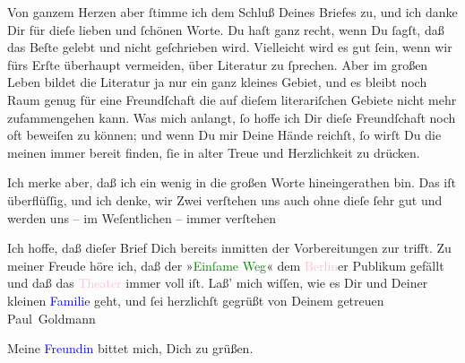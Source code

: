 \pstart
           Von ganzem Herzen  aber ſtimme ich dem Schluß Deines Briefes zu, und ich danke Dir für dieſe
               lieben {\pb}und ſchönen Worte. Du haſt ganz recht, wenn
               Du ſagſt, daß das Beſte gelebt und nicht geſchrieben wird. Vielleicht wird es gut
               ſein, wenn wir fürs Erſte überhaupt vermeiden, über Literatur zu ſprechen. Aber im
               großen Leben bildet die Literatur ja nur ein ganz kleines Gebiet, und es bleibt noch
               Raum genug für eine Freundſchaft die auf dieſem literariſchen Gebiete nicht mehr
               zufammengehen kann. Was mich anlangt, ſo hoffe ich Dir dieſe Freundſchaft noch oft
               beweiſen zu können; und  wenn Du mir Deine Hände
               reichſt, ſo wirſt Du die meinen immer bereit finden, ſie \strikeout{\textcolor{gray}{×}\-\textcolor{gray}{×}\-\textcolor{gray}{×}} in alter Treue und Herzlichkeit zu drücken.\pend
           
\pstart
            Ich merke aber, daß ich ein wenig in die großen Worte hineingerathen bin. Das
               iſt überflüſſig, und ich denke, wir Zwei verſtehen uns {\pb}auch ohne dieſe ſehr gut und werden uns – im Weſentlichen – immer verſtehen{\dotsfour}\pend
           
\pstart
           Ich hoffe, daß dieſer Brief Dich bereits inmitten der Vorbereitungen zur \label{K_L03440-4v}\label{K_L03440-4h} trifft. Zu meiner Freude höre
               ich, daß der »\textcolor{green}{Einſame Weg}{}\ledrightnote{\textcolor{green}{Der einsame Weg. Schauspiel in fünf Akten}}« dem \textcolor{pink}{Berlin}{}\ledrightnote{\textcolor{pink}{Berlin}}er Publikum gefällt und daß das \textcolor{pink}{Theater}{}\ledrightnote{{$\rightarrow$}\textcolor{pink}{Deutsches Theater Berlin}} immer voll iſt. Laß’ mich wiſſen, wie
               es Dir und Deiner kleinen \textcolor{blue}{Familie}{}\ledrightnote{{$\rightarrow$}\textcolor{blue}{Olga Schnitzler}{\newline}{$\rightarrow$}\textcolor{blue}{Heinrich Schnitzler}} geht, und ſei herzlichſt gegrüßt von Deinem
               getreuen \spacefill\mbox{Paul Goldmann}\pend
           
\pstart
           \noindent{}Meine \textcolor{blue}{Freundin}{}\ledrightnote{{$\rightarrow$}\textcolor{blue}{Theodore Rottenberg}} bittet
                  mich, Dich zu grüßen.\pend
           \endnumbering{}
\begin{anhang}
\end{anhang}
      